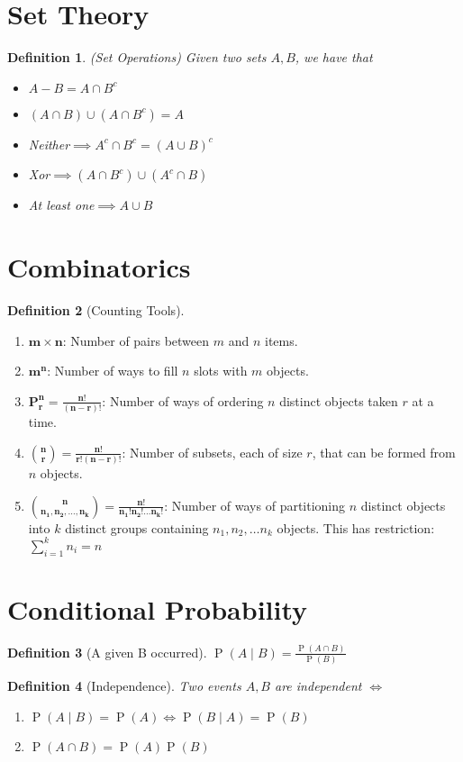 \documentclass[fontsize=12pt]{article}
\newcommand{\mdefn}[1]{$\mathbf{#1}$:}
\newcommand{\pr}[1]{\operatorname{P}(#1)}
\newtheorem*{definition}{Definition}
\begin{document}
\section{Set Theory}
\begin{definition}(Set Operations)
    Given two sets $A,B$, we have that
    \begin{itemize}
        \item $A - B = A \cap B^c$
        \item $(A \cap B) \cup (A \cap B^c) = A$
        \item Neither$ \implies A^c \cap B^c = {(A \cup B)}^c$
        \item Xor$ \implies (A \cap B^c) \cup (A^c \cap B)$
        \item At least one$ \implies A \cup B$
    \end{itemize}
\end{definition}



\section{Combinatorics}
\begin{definition}[Counting Tools]\end{definition}
\begin{enumerate}[label=(\alph*)]
    \item \mdefn{m\times n} Number of pairs between $m$ and $n$ items.
    \item \mdefn{m^n} Number of ways to fill $n$ slots with $m$ objects.
    \item \mdefn{P_r^n=\frac{n!}{(n-r)!}} Number of ways of ordering $n$ distinct objects taken $r$ at a time.
    \item \mdefn{\binom{n}{r}=\frac{n!}{r!(n-r)!}} Number of subsets, each of size $r$, that can be formed from $n$ objects.
    \item \mdefn{\binom{n}{n_1,n_2,\ldots,n_k} = \frac{n!}{n_1!n_2!\ldots n_k!}}
    Number of ways of partitioning $n$ distinct objects into $k$ distinct groups
    containing $n_1, n_2,\ldots n_k$ objects. This has restriction: $\sum_{i=1}^{k}n_i = n$
\end{enumerate}



\section{Conditional Probability}
\begin{definition}[A given B occurred]
    $\pr{A \mid B} = \frac{\pr{A \cap B}}{\pr{B}}$
\end{definition}
\begin{definition}[Independence]
Two events $A,B$ are independent $\iff$
\begin{enumerate}[label=(\roman*)]
    \item $\pr{A\mid B} = \pr{A} \iff \pr{B\mid A} = \pr{B}$
    \item $\pr{A\cap B} = \pr{A}\pr{B}$
\end{enumerate}
\end{definition}
\end{document}
